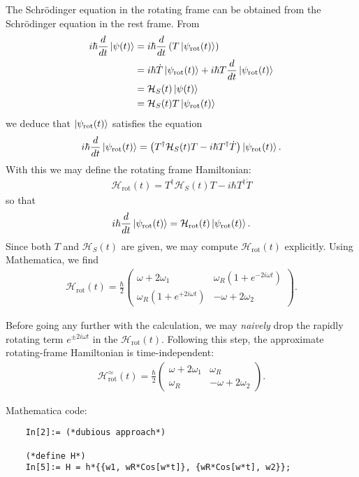 \documentclass{article}
\theoremstyle{definition}
\newcommand{\ham}{\mathcal{H}}
\newcommand{\f}[2]{\frac{#1}{#2}}
\newcommand{\lp}{\left(}
\newcommand{\rp}{\right)}
\newcommand{\psirot}{\ket{\psi_\text{rot}(t)} }
\begin{document}
\begin{enumerate}[label=\alph*)]
	The Schr\"{o}dinger equation in the rotating frame can be obtained from the Schr\"{o}dinger equation in the rest frame. From
	\begin{align*}
	i\hbar \f{d}{dt}\ket{\psi(t)} 
	&= i\hbar \f{d}{dt}\lp T\psirot \rp \\
	&= i\hbar \dot T \psirot + i\hbar T \f{d}{dt}\psirot\\
	&= \ham_S(t)\ket{\psi(t)} \\
	&= \ham_S(t) T\psirot
	\end{align*}
	we deduce that $\psirot$ satisfies the equation
	\begin{align*}
	i\hbar \f{d}{dt}\psirot = \lp T^\dagger \ham_S(t) T -i\hbar T^\dagger \dot T \rp \psirot.
	\end{align*} 
	With this we may define the rotating frame Hamiltonian:
	\begin{align*}
	\ham_\text{rot}(t) = T^\dagger \ham_S(t) T -i\hbar T^\dagger \dot T
	\end{align*}
	so that
	\begin{align*}
	i\hbar \f{d}{dt}\psirot = \ham_\text{rot}(t) \psirot.
	\end{align*}
	Since both $T$ and $\ham_S(t)$ are given, we may compute $\ham_\text{rot}(t)$ explicitly. Using Mathematica, we find
	\begin{align*}
	\ham_\text{rot}(t) = \f{\hbar}{2} \begin{pmatrix}
	 \omega +  2\omega_1 & \omega_R (1+e^{-2i\omega t}) \\ 
	 \omega_R (1+e^{+2i\omega t}) & -\omega + 2\omega_2
	\end{pmatrix}.
	\end{align*}
	
	Before going any further with the calculation, we may \textit{naively} drop the rapidly rotating term $e^{\pm 2i\omega t}$ in the $\ham_\text{rot}(t)$. Following this step, the approximate rotating-frame Hamiltonian is time-independent:
	\begin{align*}
	\ham_\text{rot}^\approx (t) =  \f{\hbar}{2} \begin{pmatrix}
	\omega +  2\omega_1 & \omega_R \\ 
	\omega_R  & -\omega + 2\omega_2
	\end{pmatrix}.
	\end{align*}
	
	Mathematica code:
	\begin{lstlisting}
	In[2]:= (*dubious approach*)
	
	(*define H*)
	In[5]:= H = h*{{w1, wR*Cos[w*t]}, {wR*Cos[w*t], w2}};
	

\end{lstlisting}
\end{enumerate}
\end{document}
